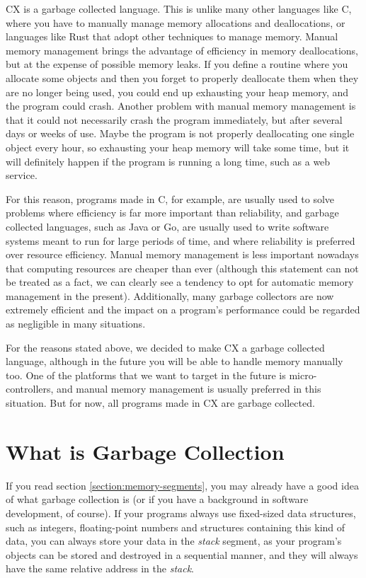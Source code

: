 \documentclass[11pt,fleqn,openany]{book} %
\begin{document}
CX is a garbage collected language. This is unlike many other languages like C, where you have to manually manage memory allocations and deallocations, or languages like Rust that adopt other techniques to manage memory. Manual memory management brings the advantage of efficiency in memory deallocations, but at the expense of possible memory leaks. If you define a routine where you allocate some objects and then you forget to properly deallocate them when they are no longer being used, you could end up exhausting your heap memory, and the program could crash. Another problem with manual memory management is that it could not necessarily crash the program immediately, but after several days or weeks of use. Maybe the program is not properly deallocating one single object every hour, so exhausting your heap memory will take some time, but it will definitely happen if the program is running a long time, such as a web service.

For this reason, programs made in C, for example, are usually used to solve problems where efficiency is far more important than reliability, and garbage collected languages, such as Java or Go, are usually used to write software systems meant to run for large periods of time, and where reliability is preferred over resource efficiency. Manual memory management is less important nowadays that computing resources are cheaper than ever (although this statement can not be treated as a fact, we can clearly see a tendency to opt for automatic memory management in the present). Additionally, many garbage collectors are now extremely efficient and the impact on a program's performance could be regarded as negligible in many situations.

For the reasons stated above, we decided to make CX a garbage collected language, although in the future you will be able to handle memory manually too. One of the platforms that we want to target in the future is micro-controllers, and manual memory management is usually preferred in this situation. But for now, all programs made in CX are garbage collected.

\section{What is Garbage Collection}

If you read section \ref{section:memory-segments}, you may already have a good idea of what garbage collection is (or if you have a background in software development, of course). If your programs always use fixed-sized data structures, such as integers, floating-point numbers and structures containing this kind of data, you can always store your data in the \emph{stack} segment, as your program's objects can be stored and destroyed in a sequential manner, and they will always have the same relative address in the \emph{stack}.
\end{document}
